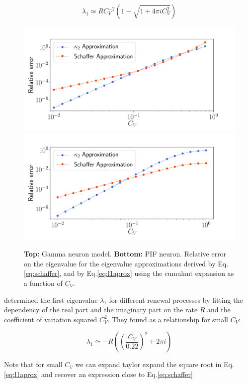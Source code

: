 \documentclass[12pt,twoside]{report}
\begin{document}
\begin{equation}
\label{eq:l1aprox}
\lambda_1\simeq RC_V^{-2}\left( 1-\sqrt{1+4\pi i C_V^2}\right)
\end{equation}

\begin{figure}[h!]
	\centering
	\includegraphics[width=0.8\linewidth]{kumulant_gamma.pdf}
	\centering
	\includegraphics[width=0.8\linewidth]{kumulant_pif.pdf}
	\caption{\textbf{Top:} Gamma  neuron model. \textbf{Bottom:} PIF neuron. Relative error on the eigenvalue for the eigenvalue approximations derived by \cite{SchOst13} Eq.\eqref{eq:schaffer}, and by Eq.\eqref{eq:l1aprox} using the cumulant expansion as a function of $C_V$.}
	\label{fig:kumulant}
\end{figure}


\cite{SchOst13} determined the first eigenvalue $\lambda_1$ for different renewal processes by fitting the dependency of the real part and the imaginary part on the rate $R$ and the coefficient of variation squared $C_V^2$. They found as a relationship for small $C_V$:

\begin{equation}
\label{eq:schaffer}
\lambda_1 \simeq -R\left( \left(\frac{C_V}{0.22}\right)^2+2\pi i\right) 
\end{equation}

Note that for small $C_V$ we can expand taylor expand the square root in Eq.\eqref{eq:l1aprox} and recover an expression close to Eq.\eqref{eq:schaffer}
\end{document}
